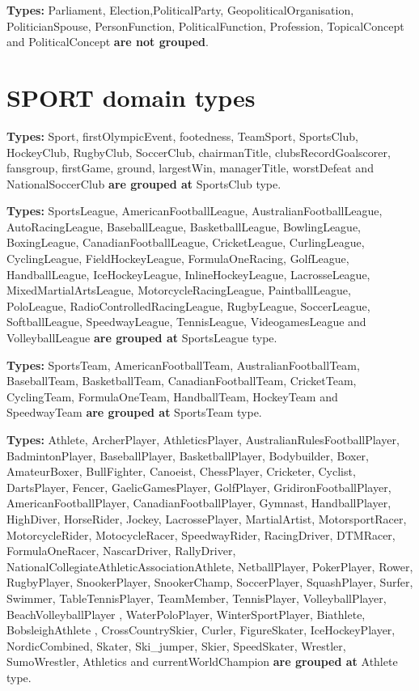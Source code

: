 \documentclass[thesis=M,english]{FITthesis}[2018/05/30]
\begin{document}
\textbf{Types:} Parliament, Election,PoliticalParty, GeopoliticalOrganisation, PoliticianSpouse, PersonFunction, PoliticalFunction, Profession, TopicalConcept and PoliticalConcept \textbf{are not grouped}.

\section{SPORT domain types}\label{SportTypes}
\textbf{Types:} Sport, firstOlympicEvent, footedness, TeamSport, SportsClub, HockeyClub, RugbyClub, SoccerClub, chairmanTitle, clubsRecordGoalscorer, fansgroup, firstGame, ground, largestWin, managerTitle, worstDefeat and NationalSoccerClub \textbf{are grouped at} SportsClub type.

\textbf{Types:} SportsLeague, AmericanFootballLeague, AustralianFootballLeague, AutoRacingLeague, BaseballLeague, BasketballLeague, BowlingLeague, BoxingLeague, CanadianFootballLeague, CricketLeague, CurlingLeague, CyclingLeague, FieldHockeyLeague, FormulaOneRacing, GolfLeague, HandballLeague, IceHockeyLeague, InlineHockeyLeague, LacrosseLeague, MixedMartialArtsLeague, MotorcycleRacingLeague, PaintballLeague, PoloLeague, RadioControlledRacingLeague, RugbyLeague, SoccerLeague, SoftballLeague, SpeedwayLeague, TennisLeague, VideogamesLeague and VolleyballLeague \textbf{are grouped at} SportsLeague type.

\textbf{Types:} SportsTeam, AmericanFootballTeam, AustralianFootballTeam, BaseballTeam, BasketballTeam, CanadianFootballTeam, CricketTeam, CyclingTeam, FormulaOneTeam, HandballTeam, HockeyTeam and SpeedwayTeam \textbf{are grouped at} SportsTeam type.

\textbf{Types:} Athlete, ArcherPlayer, AthleticsPlayer, AustralianRulesFootballPlayer, BadmintonPlayer, BaseballPlayer, BasketballPlayer, Bodybuilder, Boxer, AmateurBoxer, BullFighter, Canoeist, ChessPlayer, Cricketer, Cyclist, DartsPlayer, Fencer, GaelicGamesPlayer, GolfPlayer, GridironFootballPlayer, AmericanFootballPlayer, CanadianFootballPlayer, Gymnast, HandballPlayer, HighDiver, HorseRider, Jockey, LacrossePlayer, MartialArtist, MotorsportRacer, MotorcycleRider, MotocycleRacer, SpeedwayRider, RacingDriver, DTMRacer, FormulaOneRacer, NascarDriver, RallyDriver, NationalCollegiateAthleticAssociationAthlete, NetballPlayer, PokerPlayer, Rower, RugbyPlayer, SnookerPlayer, SnookerChamp, SoccerPlayer, SquashPlayer, Surfer, Swimmer, TableTennisPlayer, TeamMember, TennisPlayer, VolleyballPlayer, BeachVolleyballPlayer , WaterPoloPlayer, WinterSportPlayer, Biathlete, BobsleighAthlete , CrossCountrySkier, Curler, FigureSkater, IceHockeyPlayer, NordicCombined, Skater, Ski\_jumper, Skier, SpeedSkater, Wrestler, SumoWrestler, Athletics and currentWorldChampion \textbf{are grouped at} Athlete type.
\end{document}

